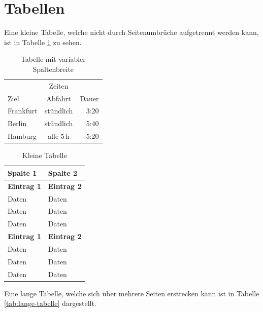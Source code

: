 \section{Tabellen}

Eine kleine Tabelle, welche nicht durch Seitenumbrüche aufgetrennt werden kann, ist in Tabelle \ref{tab:kleine-tabelle} zu sehen.

\begin{table}[htbp]
\centering
\begin{tabular}{lcr}
                   & Zeiten       & \\
Ziel            & Abfahrt    & Dauer \\
Frankfurt & stündlich & 3:20 \\
Berlin        & stündlich & 5:40 \\
Hamburg & alle 5\,h   & 5:20 \\
\end{tabular}
\caption{Tabelle mit variabler Spaltenbreite}
\end{table}

\begin{table}[htbp]
\centering
\begin{tabular}{| p{3.5cm} | p{10.5cm} |}
\hline
\textbf{Spalte 1}& \textbf{Spalte 2}\\
\hline
\textbf{Eintrag 1}& \textbf{Eintrag 2}\\
Daten& Daten\\
Daten& Daten\\
Daten& Daten\\
\hline
\textbf{Eintrag 1}& \textbf{Eintrag 2}\\
Daten& Daten\\
Daten& Daten\\
Daten& Daten\\
\hline
\end{tabular}
\caption{Kleine Tabelle}
\label{tab:kleine-tabelle}
\end{table}

Eine lange Tabelle, welche sich über mehrere Seiten erstrecken kann ist in Tabelle \ref{tab:lange-tabelle} dargestellt.

